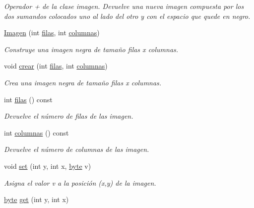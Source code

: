 \begin{DoxyCompactItemize}
\begin{DoxyCompactList}\small\item\em Operador + de la clase imagen. Devuelve una nueva imagen compuesta por los dos sumandos colocados uno al lado del otro y con el espacio que quede en negro. \end{DoxyCompactList}\item 
\hyperlink{class_imagen_a7632978f5ae089713e652bb362da1e78}{Imagen} (int \hyperlink{class_imagen_af74657d5c16a52feeda9d233cfe29b33}{filas}, int \hyperlink{class_imagen_aaed2f76db10125985aac80e439ec7b6d}{columnas})
\begin{DoxyCompactList}\small\item\em Construye una imagen negra de tamaño {\itshape filas} x {\itshape columnas}. \end{DoxyCompactList}\item 
void \hyperlink{class_imagen_a3c963c0aaa02767f65b4510cb39027ac}{crear} (int \hyperlink{class_imagen_af74657d5c16a52feeda9d233cfe29b33}{filas}, int \hyperlink{class_imagen_aaed2f76db10125985aac80e439ec7b6d}{columnas})
\begin{DoxyCompactList}\small\item\em Crea una imagen negra de tamaño {\itshape filas} x {\itshape columnas}. \end{DoxyCompactList}\item 
int \hyperlink{class_imagen_af74657d5c16a52feeda9d233cfe29b33}{filas} () const 
\begin{DoxyCompactList}\small\item\em Devuelve el número de filas de las imagen. \end{DoxyCompactList}\item 
int \hyperlink{class_imagen_aaed2f76db10125985aac80e439ec7b6d}{columnas} () const 
\begin{DoxyCompactList}\small\item\em Devuelve el número de columnas de las imagen. \end{DoxyCompactList}\item 
void \hyperlink{class_imagen_a722347f0110d794f96c92beda6710158}{set} (int y, int x, \hyperlink{imagen_8h_a0c8186d9b9b7880309c27230bbb5e69d}{byte} v)
\begin{DoxyCompactList}\small\item\em Asigna el valor {\itshape v} a la posición ({\itshape x},{\itshape y}) de la imagen. \end{DoxyCompactList}\item 
\hyperlink{imagen_8h_a0c8186d9b9b7880309c27230bbb5e69d}{byte} \hyperlink{class_imagen_ab8a0d7d44f6d22678ed7fea1e9617e25}{get} (int y, int x)

\end{DoxyCompactItemize}
